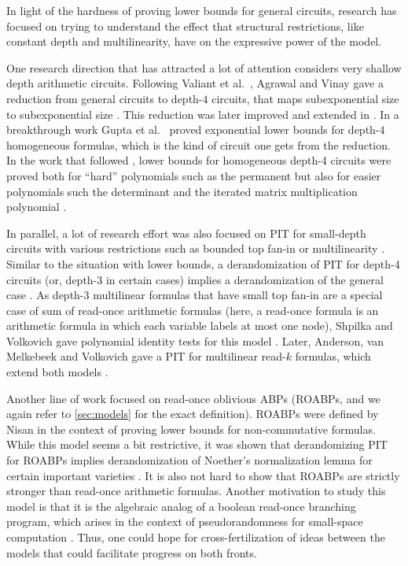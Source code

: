 \documentclass[11pt]{article}
\begin{document}
In light of the hardness of proving lower bounds for general circuits, research has focused on trying to understand the effect that structural restrictions, like constant depth and multilinearity, have on the expressive power of the model. %

One research direction that has attracted a lot of attention considers very shallow depth arithmetic circuits. Following Valiant et al.\ \cite{vsbr83}, Agrawal and Vinay gave a reduction from general circuits to depth-$4$ circuits, that maps subexponential size to subexponential size \cite{av08}. This reduction was later improved and extended in \cite{ koiran, Tav13, gkks13b}. In a breakthrough work Gupta et al.\  \cite{gkks13} proved exponential lower bounds for depth-$4$ homogeneous formulas, which is the kind of circuit one gets from the reduction.  In the work that followed  \cite{gkks13}, lower bounds for homogeneous depth-4 circuits were proved both for ``hard'' polynomials such as the permanent but also for easier polynomials such the determinant and the iterated matrix multiplication polynomial \cite{KSS13, FLMS13, KLSS, KS14, KS14a}. 

In parallel, a lot of research effort was also focused on PIT for small-depth circuits with various restrictions such as bounded top fan-in or multilinearity \cite{DS07, KS07, ks09, SS12, kmsv13, sv11, osv15}. Similar to the situation with lower bounds, a derandomization of PIT for depth-4  circuits (or, depth-3 in certain cases) implies a derandomization of the general case \cite{av08,gkks13b}. As depth-$3$ multilinear formulas that have small top fan-in are a special case of sum of read-once arithmetic formulas (here, a read-once formula is an arithmetic formula in which each variable labels at most one node), Shpilka and Volkovich gave polynomial identity tests for this model  \cite{SV15}. Later, Anderson, van Melkebeek and Volkovich gave a PIT for multilinear read-$k$ formulas, which extend both models \cite{amv11}. 


Another line of work focused on read-once oblivious ABPs (ROABPs, and we again refer to \autoref{sec:models} for the exact definition). ROABPs were defined by Nisan \cite{nis91} in the context of proving lower bounds for non-commutative formulas. While this model seems a bit restrictive, it was shown that derandomizing PIT for ROABPs implies derandomization of Noether's normalization lemma for certain important varieties \cite{Mulmuley12,FS13b}. It is also not hard to show that ROABPs are strictly stronger than read-once arithmetic formulas. Another motivation to study this model is that it is the algebraic analog of a boolean read-once branching program, which arises in the context of pseudorandomness for small-space computation \cite{Nisan92}. Thus, one could hope for cross-fertilization of ideas between the models that could facilitate progress on both fronts.
\end{document}

